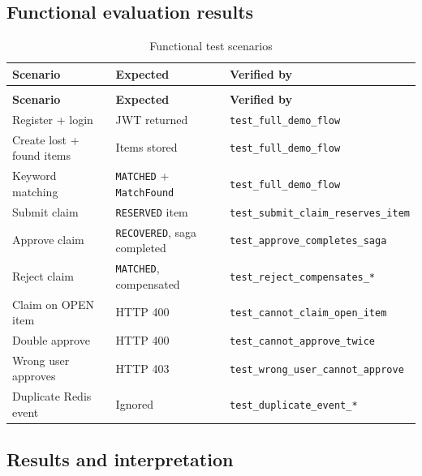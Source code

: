\documentclass[11pt,a4paper]{article}
\begin{document}
\subsection{Functional evaluation results}

\begingroup
\small
\renewcommand{\arraystretch}{1.35}
\setlength{\tabcolsep}{6pt}

\begin{longtable}{@{}
>{\raggedright\arraybackslash}p{4.5cm}
>{\raggedright\arraybackslash}p{3.5cm}
>{\raggedright\arraybackslash}p{5.5cm}
@{}}
\caption{Functional test scenarios}
\label{tab:functional} \\
\toprule
\textbf{Scenario} & \textbf{Expected} & \textbf{Verified by} \\
\midrule
\endfirsthead
\multicolumn{3}{c}{\tablename\ \thetable\ -- continued} \\
\toprule
\textbf{Scenario} & \textbf{Expected} & \textbf{Verified by} \\
\midrule
\endhead

Register + login & JWT returned & \texttt{test\_full\_demo\_flow} \\
Create lost + found items & Items stored & \texttt{test\_full\_demo\_flow} \\
Keyword matching & \texttt{MATCHED} + \texttt{MatchFound} & \texttt{test\_full\_demo\_flow} \\
Submit claim & \texttt{RESERVED} item & \texttt{test\_submit\_claim\_reserves\_item} \\
Approve claim & \texttt{RECOVERED}, saga completed & \texttt{test\_approve\_completes\_saga} \\
Reject claim & \texttt{MATCHED}, compensated & \texttt{test\_reject\_compensates\_*} \\
Claim on OPEN item & HTTP 400 & \texttt{test\_cannot\_claim\_open\_item} \\
Double approve & HTTP 400 & \texttt{test\_cannot\_approve\_twice} \\
Wrong user approves & HTTP 403 & \texttt{test\_wrong\_user\_cannot\_approve} \\
Duplicate Redis event & Ignored & \texttt{test\_duplicate\_event\_*} \\

\bottomrule
\end{longtable}
\endgroup

\subsection{Results and interpretation}
\end{document}
